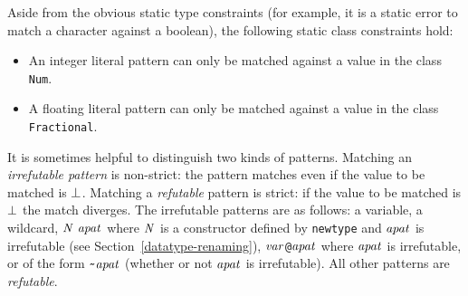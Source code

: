 Aside from the obvious static type constraints (for
example, it is a static error to match a character against a
boolean), the following static class constraints hold: 
\begin{itemize}
\item An integer
literal pattern
can only be matched against a value in the class
\mbox{\tt Num}.
\item A floating literal pattern
can only be matched against a value
in the class \mbox{\tt Fractional}.
\end{itemize}

It is sometimes helpful to distinguish two kinds of
patterns.  Matching an {\em irrefutable pattern}
is non-strict: the pattern matches even if the value to be matched is \mbox{$\it \bot$}.
Matching a {\em refutable} pattern is strict: if the value to be matched
is \mbox{$\it \bot$} the match diverges.
The irrefutable patterns are as follows:
a variable, a wildcard, \mbox{$\it N\ apat$} where \mbox{$\it N$} is a constructor
defined by \mbox{\tt newtype} and \mbox{$\it apat$} is irrefutable (see
Section~\ref{datatype-renaming}), 
\mbox{$\it var$}{\tt @}\mbox{$\it apat$} where \mbox{$\it apat$} is irrefutable,
or of the form \mbox{$\it \makebox{\tt {\char'176}}apat$} (whether or not \mbox{$\it apat$} is irrefutable).
All other patterns are {\em refutable}.

